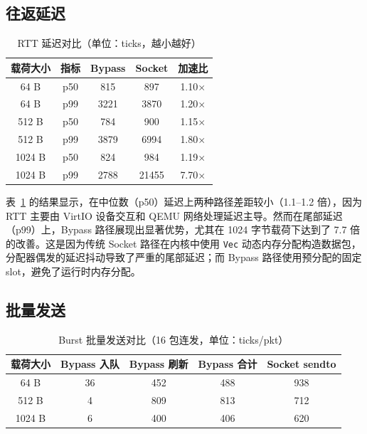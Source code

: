 \subsection{往返延迟}

\begin{table}[htbp]
    \centering
    \caption{RTT 延迟对比（单位：ticks，越小越好）}
    \label{tab:rtt-latency}
    \begin{tabular}{ccccc}
        \toprule
        载荷大小 & 指标 & Bypass & Socket & 加速比 \\
        \midrule
        64 B   & p50 & 815   & 897    & 1.10$\times$ \\
        64 B   & p99 & 3221  & 3870   & 1.20$\times$ \\
        512 B  & p50 & 784   & 900    & 1.15$\times$ \\
        512 B  & p99 & 3879  & 6994   & 1.80$\times$ \\
        1024 B & p50 & 824   & 984    & 1.19$\times$ \\
        1024 B & p99 & 2788  & 21455  & 7.70$\times$ \\
        \bottomrule
    \end{tabular}
\end{table}

表~\ref{tab:rtt-latency} 的结果显示，在中位数（p50）延迟上两种路径差距较小（1.1--1.2 倍），因为 RTT 主要由 VirtIO 设备交互和 QEMU 网络处理延迟主导。然而在尾部延迟（p99）上，Bypass 路径展现出显著优势，尤其在 1024 字节载荷下达到了 7.7 倍的改善。这是因为传统 Socket 路径在内核中使用 \texttt{Vec} 动态内存分配构造数据包，分配器偶发的延迟抖动导致了严重的尾部延迟；而 Bypass 路径使用预分配的固定 slot，避免了运行时内存分配。

\subsection{批量发送}

\begin{table}[htbp]
    \centering
    \caption{Burst 批量发送对比（16 包连发，单位：ticks/pkt）}
    \label{tab:burst}
    \begin{tabular}{ccccc}
        \toprule
        载荷大小 & Bypass 入队 & Bypass 刷新 & Bypass 合计 & Socket sendto \\
        \midrule
        64 B   & 36 & 452  & 488 & 938  \\
        512 B  & 4  & 809  & 813 & 712  \\
        1024 B & 6  & 400  & 406 & 620  \\
        \bottomrule
    \end{tabular}
\end{table}

